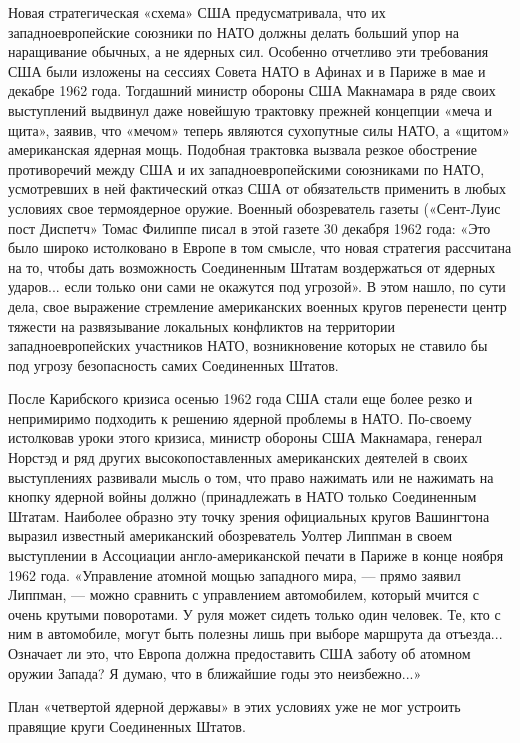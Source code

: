\documentclass[12pt, a4paper, openany]{book}
\begin{document}
Новая стратегическая «схема» США предусматривала, что их западноевропейские союзники по НАТО должны делать больший упор на наращивание обычных, а не ядерных сил. Особенно отчетливо эти требования США были изложены на сессиях Совета НАТО в Афинах и в Париже в мае и декабре 1962 года. Тогдашний министр обороны США Макнамара в ряде своих выступлений выдвинул даже новейшую трактовку прежней концепции «меча и щита», заявив, что «мечом» теперь являются сухопутные силы НАТО, а «щитом» американская ядерная мощь. Подобная трактовка вызвала резкое обострение противоречий между США и их западноевропейскими союзниками по НАТО, усмотревших в ней фактический отказ США от обязательств применить в любых условиях свое термоядерное оружие. Военный обозреватель газеты («Сент-Луис пост Диспетч» Томас Филиппе писал в этой газете 30 декабря 1962 года: «Это было широко истолковано в Европе в том смысле, что новая стратегия рассчитана на то, чтобы дать возможность Соединенным Штатам воздержаться от ядерных ударов... если только они сами не окажутся под угрозой». В этом нашло, по сути дела, свое выражение стремление американских военных кругов перенести центр тяжести на развязывание локальных конфликтов на территории западноевропейских участников НАТО, возникновение которых не ставило бы под угрозу безопасность самих Соединенных Штатов.
	
После Карибского кризиса осенью 1962 года США стали еще более резко и непримиримо подходить к решению ядерной проблемы в НАТО. По-своему истолковав уроки этого кризиса, министр обороны США Макнамара, генерал Норстэд и ряд других высокопоставленных американских деятелей в своих выступлениях развивали мысль о том, что право нажимать или не нажимать на кнопку ядерной войны должно (принадлежать в НАТО только Соединенным Штатам. Наиболее образно эту точку зрения официальных кругов Вашингтона выразил известный американский обозреватель Уолтер Липпман в своем выступлении в Ассоциации англо-американской печати в Париже в конце ноября 1962 года. «Управление атомной мощью западного мира, — прямо заявил Липпман, — можно сравнить с управлением автомобилем, который мчится с очень крутыми поворотами. У руля может сидеть только один человек. Те, кто с ним в автомобиле, могут быть полезны лишь при выборе маршрута да отъезда... Означает ли это, что Европа должна предоставить США заботу об атомном оружии Запада? Я думаю, что в ближайшие годы это неизбежно...»
	
	
План «четвертой ядерной державы» в этих условиях уже не мог устроить правящие круги Соединенных Штатов.
	
\end{document}
